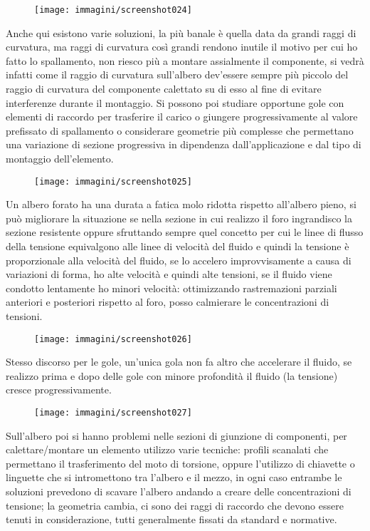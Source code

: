 \documentclass{article}
\begin{document}
\begin{adjustwidth}{2in}{}
			\begin{figure}[H]
				\centering
				\texttt{[image: immagini/screenshot024]}
				\label{fig:screenshot024}
			\end{figure}
Anche qui esistono varie soluzioni, la più banale è quella data da grandi raggi di curvatura, ma raggi di curvatura così grandi rendono inutile il motivo per cui ho fatto lo spallamento, non riesco più a montare assialmente il componente, si vedrà infatti come il raggio di curvatura sull'albero dev'essere sempre più piccolo del raggio di curvatura del componente calettato su di esso al fine di evitare interferenze durante il montaggio. Si possono poi studiare opportune gole con elementi di raccordo per trasferire il carico o giungere progressivamente al valore prefissato di spallamento o considerare geometrie più complesse che permettano una variazione di sezione progressiva in dipendenza dall'applicazione e dal tipo di montaggio dell'elemento.
			\begin{figure}[H]
				\centering
				\texttt{[image: immagini/screenshot025]}
				\label{fig:screenshot025}
			\end{figure}
			\newpage			
			Un albero forato ha una durata a fatica molo ridotta rispetto all'albero pieno, si può migliorare la situazione se nella sezione in cui realizzo il foro ingrandisco la sezione resistente oppure sfruttando sempre quel concetto per cui le linee di flusso della tensione equivalgono alle linee di velocità del fluido e quindi la tensione è proporzionale alla velocità del fluido, se lo accelero improvvisamente a causa di variazioni di forma, ho alte velocità e quindi alte tensioni, se il fluido viene condotto lentamente ho minori velocità:  ottimizzando rastremazioni parziali anteriori e posteriori rispetto al foro, posso calmierare le concentrazioni di tensioni. 
			\begin{figure}[H]
				\centering
				\texttt{[image: immagini/screenshot026]}
				\label{fig:screenshot026}
			\end{figure}			
			Stesso discorso per le gole, un'unica gola non fa altro che accelerare il fluido, se realizzo prima e dopo delle gole con minore profondità il fluido (la tensione) cresce progressivamente. 
			\begin{figure}[H]
				\centering
				\texttt{[image: immagini/screenshot027]}
				\label{fig:screenshot027}
			\end{figure}			
			Sull'albero poi si hanno problemi nelle sezioni di giunzione di componenti, per calettare/montare un elemento utilizzo varie tecniche: profili scanalati che permettano il trasferimento del moto di torsione, oppure l'utilizzo di chiavette o linguette che si intromettono tra l'albero e il mezzo, in ogni caso entrambe le soluzioni prevedono di scavare l'albero andando a creare delle concentrazioni di tensione; la geometria cambia, ci sono dei raggi di raccordo che devono essere tenuti in considerazione, tutti generalmente fissati da standard e normative.
			
	\end{adjustwidth}
\end{document}
